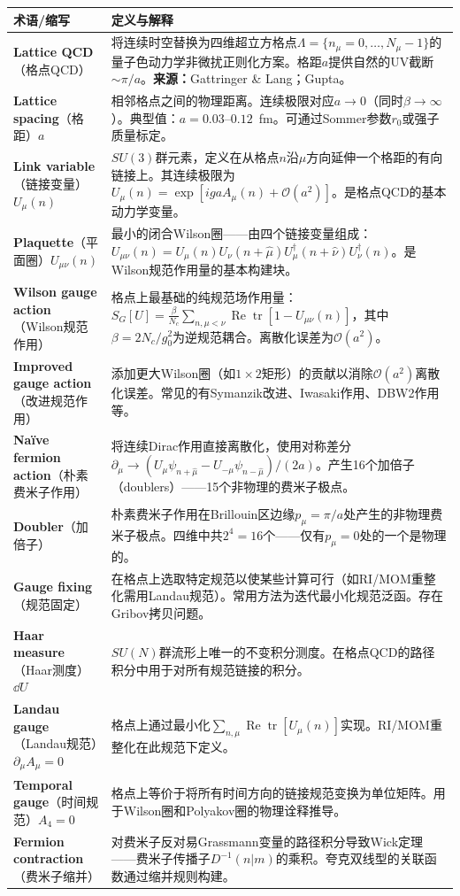 \documentclass[12pt,a4paper]{ctexart}
\begin{document}
\begin{longtable}{p{3.5cm}p{9cm}}
\toprule
\textbf{术语/缩写} & \textbf{定义与解释} \\
\midrule
\endhead
\textbf{Lattice QCD}（格点QCD）& 将连续时空替换为四维超立方格点$\Lambda = \{n_\mu = 0,\dots,N_\mu-1\}$的量子色动力学非微扰正则化方案。格距$a$提供自然的UV截断$\sim\pi/a$。\textbf{来源：}Gattringer \& Lang；Gupta。\\
\textbf{Lattice spacing}（格距）$a$& 相邻格点之间的物理距离。连续极限对应$a\to 0$（同时$\beta\to\infty$）。典型值：$a = 0.03\text{--}0.12$~fm。可通过Sommer参数$r_0$或强子质量标定。\\
\textbf{Link variable}（链接变量）$U_\mu(n)$& $SU(3)$群元素，定义在从格点$n$沿$\mu$方向延伸一个格距的有向链接上。其连续极限为$U_\mu(n) = \exp[igaA_\mu(n) + \mathcal{O}(a^2)]$。是格点QCD的基本动力学变量。\\
\textbf{Plaquette}（平面圈）$U_{\mu\nu}(n)$& 最小的闭合Wilson圈——由四个链接变量组成：$U_{\mu\nu}(n) = U_\mu(n)U_\nu(n+\hat\mu)U_\mu^\dagger(n+\hat\nu)U_\nu^\dagger(n)$。是Wilson规范作用量的基本构建块。\\
\textbf{Wilson gauge action}（Wilson规范作用）& 格点上最基础的纯规范场作用量：$S_G[U] = \frac{\beta}{N_c}\sum_{n,\mu<\nu}\operatorname{Re}\operatorname{tr}[1-U_{\mu\nu}(n)]$，其中$\beta = 2N_c/g_0^2$为逆规范耦合。离散化误差为$\mathcal{O}(a^2)$。\\
\textbf{Improved gauge action}（改进规范作用）& 添加更大Wilson圈（如$1\times 2$矩形）的贡献以消除$\mathcal{O}(a^2)$离散化误差。常见的有Symanzik改进、Iwasaki作用、DBW2作用等。\\
\textbf{Na\"ive fermion action}（朴素费米子作用）& 将连续Dirac作用直接离散化，使用对称差分$\partial_\mu \to (U_\mu\psi_{n+\hat\mu} - U_{-\mu}\psi_{n-\hat\mu})/(2a)$。产生16个加倍子（doublers）——15个非物理的费米子极点。\\
\textbf{Doubler}（加倍子）& 朴素费米子作用在Brillouin区边缘$p_\mu = \pi/a$处产生的非物理费米子极点。四维中共$2^4=16$个——仅有$p_\mu=0$处的一个是物理的。\\
\textbf{Gauge fixing}（规范固定）& 在格点上选取特定规范以使某些计算可行（如RI/MOM重整化需用Landau规范）。常用方法为迭代最小化规范泛函。存在Gribov拷贝问题。\\
\textbf{Haar measure}（Haar测度）$\dd U$& $SU(N)$群流形上唯一的不变积分测度。在格点QCD的路径积分中用于对所有规范链接的积分。\\
\textbf{Landau gauge}（Landau规范）$\partial_\mu A_\mu = 0$& 格点上通过最小化$\sum_{n,\mu}\operatorname{Re}\operatorname{tr}[U_\mu(n)]$实现。RI/MOM重整化在此规范下定义。\\
\textbf{Temporal gauge}（时间规范）$A_4 = 0$& 格点上等价于将所有时间方向的链接规范变换为单位矩阵。用于Wilson圈和Polyakov圈的物理诠释推导。\\
\textbf{Fermion contraction}（费米子缩并）& 对费米子反对易Grassmann变量的路径积分导致Wick定理——费米子传播子$D^{-1}(n|m)$的乘积。夸克双线型的关联函数通过缩并规则构建。\\
\bottomrule
\end{longtable}
\end{document}
